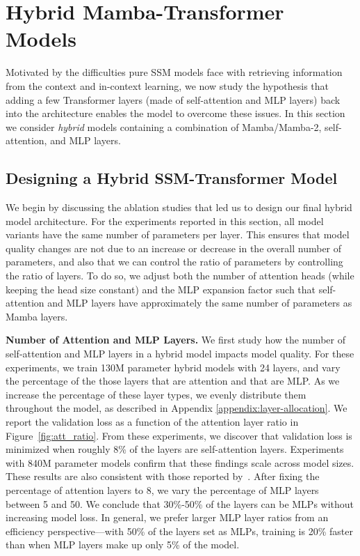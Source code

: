 \section{Hybrid Mamba-Transformer Models} Motivated by the difficulties pure SSM models face with retrieving information from the context and in-context learning, we now study the hypothesis that adding a few Transformer layers (made of self-attention and MLP layers) back into the architecture enables the model to overcome these issues. In this section we consider \textit{hybrid} models containing a combination of Mamba/Mamba-2, self-attention, and MLP layers.

\subsection{Designing a Hybrid SSM-Transformer Model}
\label{subsec:hybrid_design}
We begin by discussing the ablation studies that led us to design our final hybrid model architecture. For the experiments reported in this section, all model variants have the same number of parameters per layer. This ensures that model quality changes are not due to an increase or decrease in the overall number of parameters, and also that we can control the ratio of parameters by controlling the ratio of layers. To do so, we adjust both the number of attention heads (while keeping the head size constant) and the MLP expansion factor such that self-attention and MLP layers have approximately the same number of parameters as Mamba layers.

\textbf{Number of Attention and MLP Layers.} We first study how the number of self-attention and MLP layers in a hybrid model impacts model quality. For these experiments, we train 130M parameter hybrid models with 24 layers, and vary the percentage of the those layers that are attention and that are MLP. As we increase the percentage of these layer types, we evenly distribute them throughout the model, as described in Appendix \ref{appendix:layer-allocation}. We report the validation loss as a function of the attention layer ratio in Figure~\ref{fig:att_ratio}. From these experiments, we discover that validation loss is minimized when roughly 8\% of the layers are self-attention layers. Experiments with 840M parameter models confirm that these findings scale across model sizes. These results are also consistent with those reported by~\cite{dao2024transformers}. After fixing the percentage of attention layers to 8, we vary the percentage of MLP layers between 5 and 50. We conclude that 30\%-50\% of the layers can be MLPs without increasing model loss. In general, we prefer larger MLP layer ratios from an efficiency perspective---with 50\% of the layers set as MLPs, training is 20\% faster than when MLP layers make up only 5\% of the model. 

